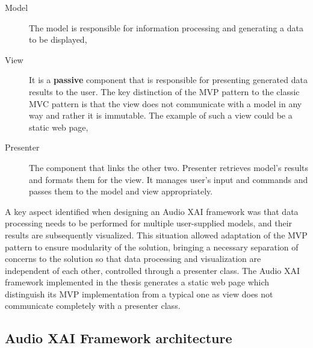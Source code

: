 \documentclass[
    bindingoffset=5mm,  %
    footnoteindent=3mm, %
    hyphenation=true    %
]{src/wut-thesis}
\begin{document}
\begin{description}
    \item[Model] The model is responsible for information processing and
        generating a data to be displayed,
    \item[View] It is a \textbf{passive} component that is responsible for presenting 
        generated data results to the user. The key distinction of the MVP pattern
        to the classic MVC pattern is that the view does not communicate with a
        model in any way and rather it is immutable. The example of such a view
        could be a static web page,
    \item[Presenter] The component that links the other two. Presenter retrieves model's
        results and formats them for the view.
        It manages user's input and commands and passes them to the model and view appropriately.
\end{description}

A key aspect identified when designing an Audio XAI framework was that data processing needs
to be performed for multiple user-supplied models, and their results are subsequently visualized.
This situation allowed adaptation of the MVP pattern to ensure modularity of the solution,
bringing a necessary separation of concerns to the solution so that data processing and
visualization are independent of each other, controlled through a presenter class.
The Audio XAI framework implemented in the thesis generates a static web page which
distinguish its MVP implementation from a typical one as view does not communicate completely
with a presenter class.

\subsection{Audio XAI Framework architecture} \label{ch2:ArchitectureOverview}


%
%
\clearpage %
\end{document}
